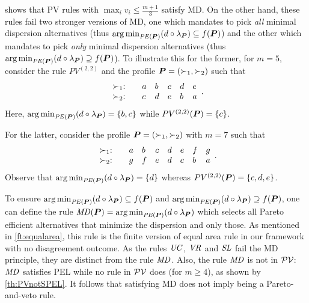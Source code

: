 \documentclass[pagesize, twoside=off, bibliography=totoc, DIV=calc, fontsize=12pt, a4paper]{scrartcl}
\begin{document}

\begin{remark}
	 shows that PV rules with $\max_i v_i ≤ \frac{m + 1}{3}$ satisfy MD. On the other hand, these rules fail two stronger versions of MD, one which mandates to pick \emph{all} minimal dispersion alternatives (thus $\argmin_{\PE} (d \circ \lprof) \subseteq f(\prof)$) and the other which mandates to pick \emph{only} minimal dispersion alternatives (thus $\argmin_{\PE} (d \circ \lprof) \supseteq f(\prof)$). To illustrate this for the former, for $m = 5$, consider the rule $PV^{(2, 2)}$ and the profile $\bm{P} = (\succ_1, \succ_2)$ such that
	\begin{equation}
		\begin{array}{l @{:\hskip 2em} *5{l}}
			\pref_1&a& b & c & d & e \\
			\pref_2&c& d & e & b & a\\
		\end{array}.
	\end{equation}
	Here, $\argmin_{\PE} (d \circ \lprof) = \set{b, c}$ while $PV^{(2, 2)}(\bm{P}) = \{c\}$.

For the latter, consider the profile $\bm{P} = (\succ_1, \succ_2)$ with $m=7$ such that
	\begin{equation}
		\begin{array}{l @{:\hskip 2em} *7{l}}
			\pref_1&a& b & c & d & e & f & g\\
			\pref_2&g& f & e & d & c& b & a \\
		\end{array}.
	\end{equation}
Observe that $\argmin_{\PE} (d \circ \lprof) = \set{d}$ whereas $PV^{(2, 2)}(\bm{P})=\{c,d,e\}$.
\end{remark}

\begin{remark}
	To ensure $\argmin_{\PE} (d \circ \lprof) \subseteq f(\prof)$ and $\argmin_{\PE} (d \circ \lprof) \supseteq f(\prof)$, one can define the rule $\MD(\prof) = \argmin_{\PE}(d \circ \lprof)$ which selects all Pareto efficient alternatives that minimize the dispersion and only those. As mentioned in \cref{ft:equalarea}, this rule is the finite version of  equal area rule in our framework with no disagreement outcome.
 As the rules $\mathit{UC}$, $\mathit{VR}$ and $\mathit{SL}$ fail the MD principle, they are distinct from the rule $\mathit{MD}$. Also, the rule $\mathit{MD}$ is not in $\mathcal{PV}$: $\mathit{MD}$ satisfies PEL while no rule in $\mathcal{PV}$ does (for $m ≥ 4$), as shown by \cref{th:PVnotSPEL}. It follows that satisfying MD does not imply being a Pareto-and-veto rule.
\end{remark}
\end{document}
